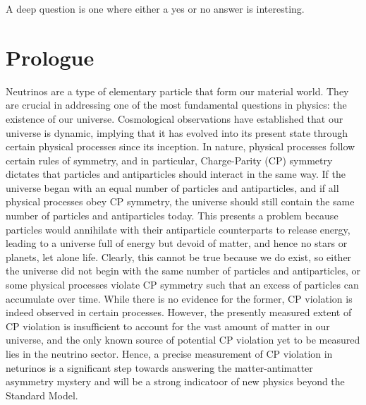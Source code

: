 \begin{savequote}[8cm]
\textlatin{A deep question is one where either a yes or no answer is interesting.}

\end{savequote}

\chapter{\label{ch:intro}Prologue} 

\minitoc

Neutrinos are a type of elementary particle that form our material world. 
They are crucial in addressing one of the most fundamental questions in physics: the existence of our universe. 
Cosmological observations have established that our universe is dynamic, implying that it has evolved into its present state through certain physical processes since its inception.
In nature, physical processes follow certain rules of symmetry, and in particular, Charge-Parity (CP) symmetry dictates that particles and antiparticles should interact in the same way. 
If the universe began with an equal number of particles and antiparticles, and if all physical processes obey CP symmetry, the universe should still contain the same number of particles and antiparticles today.
This presents a problem because particles would annihilate with their antiparticle counterparts to release energy, leading to a universe full of energy but devoid of matter, and hence no stars or planets, let alone life.
Clearly, this cannot be true because we do exist, so either the universe did not begin with the same number of particles and antiparticles, or some physical processes violate CP symmetry such that an excess of particles can accumulate over time. 
While there is no evidence for the former, CP violation is indeed observed in certain processes. 
However, the presently measured extent of CP violation is insufficient to account for the vast amount of matter in our universe, and the only known source of potential CP violation yet to be measured lies in the neutrino sector. 
Hence, a precise measurement of CP violation in neturinos is a significant step towards answering the matter-antimatter asymmetry mystery and will be a strong indicatoor of new physics beyond the Standard Model.

